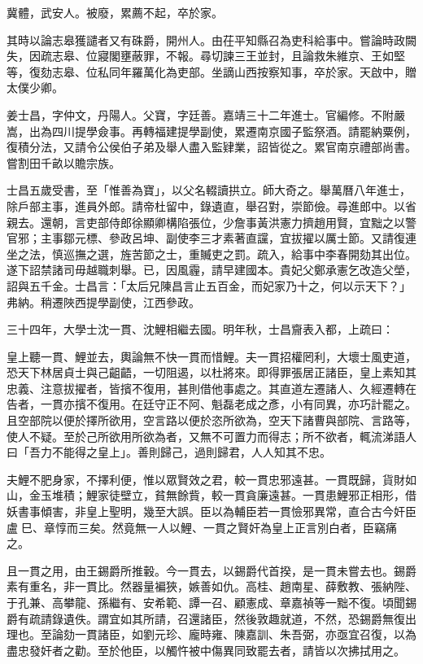 \begin{pinyinscope}
冀體，武安人。被廢，累薦不起，卒於家。

其時以論志皋獲譴者又有硃爵，開州人。由茌平知縣召為吏科給事中。嘗論時政闕失，因疏志皋、位寢閣壅蔽罪，不報。尋切諫三王並封，且論救朱維京、王如堅等，復劾志皋、位私同年羅萬化為吏部。坐謫山西按察知事，卒於家。天啟中，贈太僕少卿。

姜士昌，字仲文，丹陽人。父寶，字廷善。嘉靖三十二年進士。官編修。不附嚴嵩，出為四川提學僉事。再轉福建提學副使，累遷南京國子監祭酒。請罷納粟例，復積分法，又請令公侯伯子弟及舉人盡入監肄業，詔皆從之。累官南京禮部尚書。嘗割田千畝以贍宗族。

士昌五歲受書，至「惟善為寶」，以父名輟讀拱立。師大奇之。舉萬曆八年進士，除戶部主事，進員外郎。請帝杜留中，錄遺直，舉召對，崇節儉。尋進郎中。以省親去。還朝，言吏部侍郎徐顯卿構陷張位，少詹事黃洪憲力擠趙用賢，宜黜之以警官邪；主事鄒元標、參政呂坤、副使李三才素著直讜，宜拔擢以厲士節。又請復連坐之法，慎巡撫之選，旌苦節之士，重贓吏之罰。疏入，給事中李春開劾其出位。遂下詔禁諸司毋越職刺舉。已，因風霾，請早建國本。貴妃父鄭承憲乞改造父塋，詔與五千金。士昌言：「太后兄陳昌言止五百金，而妃家乃十之，何以示天下？」弗納。稍遷陜西提學副使，江西參政。

三十四年，大學士沈一貫、沈鯉相繼去國。明年秋，士昌齎表入都，上疏曰：

皇上聽一貫、鯉並去，輿論無不快一貫而惜鯉。夫一貫招權罔利，大壞士風吏道，恐天下林居貞士與己齟齬，一切阻遏，以杜將來。即得罪張居正諸臣，皇上素知其忠義、注意拔擢者，皆擯不復用，甚則借他事處之。其直道左遷諸人、久經遷轉在告者，一貫亦擯不復用。在廷守正不阿、魁磊老成之彥，小有同異，亦巧計罷之。且空部院以便於擇所欲用，空言路以便於恣所欲為，空天下諸曹與部院、言路等，使人不疑。至於己所欲用所欲為者，又無不可置力而得志；所不欲者，輒流涕語人曰「吾力不能得之皇上」。善則歸己，過則歸君，人人知其不忠。

夫鯉不肥身家，不擇利便，惟以眾賢效之君，較一貫忠邪遠甚。一貫既歸，貨財如山，金玉堆積；鯉家徒壁立，貧無餘貲，較一貫貪廉遠甚。一貫患鯉邪正相形，借妖書事傾害，非皇上聖明，幾至大誤。臣以為輔臣若一貫憸邪異常，直合古今奸臣盧巳、章惇而三矣。然竟無一人以鯉、一貫之賢奸為皇上正言別白者，臣竊痛之。

且一貫之用，由王錫爵所推轂。今一貫去，以錫爵代首揆，是一貫未嘗去也。錫爵素有重名，非一貫比。然器量褊狹，嫉善如仇。高桂、趙南星、薛敷教、張納陛、于孔兼、高攀龍、孫繼有、安希範、譚一召、顧憲成、章嘉禎等一黜不復。頃聞錫爵有疏請錄遺佚。謂宜如其所請，召還諸臣，然後敦趣就道，不然，恐錫爵無復出理也。至論劾一貫諸臣，如劉元珍、龐時雍、陳嘉訓、朱吾弼，亦亟宜召復，以為盡忠發奸者之勸。至於他臣，以觸忤被中傷異同致罷去者，請皆以次拂拭用之。


\end{pinyinscope}
